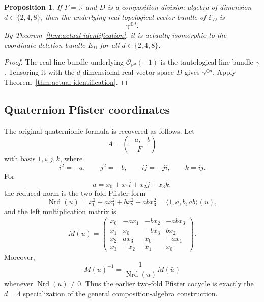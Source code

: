 \documentclass[12pt]{article}
\theoremstyle{plain}
\newtheorem{proposition}[theorem]{Proposition}
\theoremstyle{definition}
\newcommand{\R}{\mathbb R}
\newcommand{\PP}{\mathbb P}
\newcommand{\OO}{\mathcal O}
\newcommand{\Nrd}{\operatorname{Nrd}}
\begin{document}
\begin{proposition}
	\label{prop:real-quadratic-bundle}
	If $F=\R$ and $D$ is a composition division algebra of dimension
	$d\in\{2,4,8\}$, then the underlying real topological vector bundle of
	$\mathscr E_D$ is
	\[
	\gamma^{\oplus d}.
	\]
	By Theorem~\ref{thm:actual-identification}, it is actually isomorphic
	to the coordinate-deletion bundle $E_D$ for all $d\in\{2,4,8\}$.
\end{proposition}

\begin{proof}
	The real line bundle underlying $\OO_{\PP^d}(-1)$ is the tautological
	line bundle $\gamma$. Tensoring it with the $d$-dimensional real vector
	space $D$ gives $\gamma^{\oplus d}$. Apply
	Theorem~\ref{thm:actual-identification}.
\end{proof}

\subsection{Quaternion Pfister coordinates}

The original quaternionic formula is recovered as follows. Let
\[
A=\left(\frac{-a,-b}{F}\right)
\]
with basis $1,i,j,k$, where
\[
i^2=-a,\qquad j^2=-b,\qquad ij=-ji,
\qquad k=ij.
\]
For
\[
u=x_0+x_1i+x_2j+x_3k,
\]
the reduced norm is the two-fold Pfister form
\[
\Nrd(u)=x_0^2+ax_1^2+bx_2^2+abx_3^2
=\langle1,a,b,ab\rangle(u),
\]
and the left multiplication matrix is
\[
M(u)=
\begin{pmatrix}
	x_0 & -a x_1 & -b x_2 & -abx_3\\
	x_1 & x_0 & -b x_3 & b x_2\\
	x_2 & a x_3 & x_0 & -a x_1\\
	x_3 & -x_2 & x_1 & x_0
\end{pmatrix}.
\]
Moreover,
\[
M(u)^{-1}
=\frac{1}{\Nrd(u)}M(\bar u)
\]
whenever $\Nrd(u)\ne0$. Thus the earlier two-fold Pfister cocycle is
exactly the $d=4$ specialization of the general composition-algebra
construction.
\end{document}
